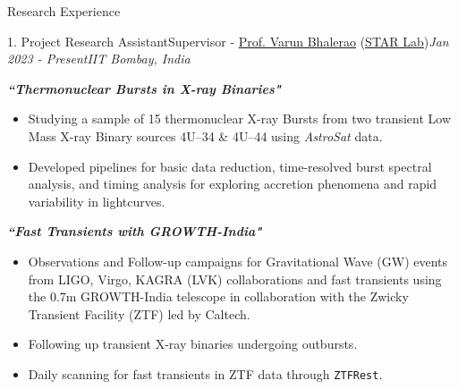 \vspace{-0.7em}
\begin{section}{Research Experience}

    \begin{subsectionnobullet1}{1. Project Research Assistant}{Supervisor - \href{https://www.phy.iitb.ac.in/en/content/varun-bhalerao}{Prof. Varun Bhalerao} (\href{https://www.star-iitb.in/}{STAR Lab})}{\textit{Jan 2023 - Present}}{\textit{IIT Bombay, India}}{}

        \vspace{-0.5em}

        \textbf{\textit{``Thermonuclear Bursts in X-ray Binaries"}}
        \vspace{-0.5em}
        \begin{itemize}
            \item Studying a sample of 15 thermonuclear X-ray Bursts from two transient Low Mass X-ray Binary sources 4U--34 \& 4U--44 using \textit{AstroSat} data.
            \vspace{-0.5em}
            \item Developed pipelines for basic data reduction, time-resolved burst spectral analysis, and timing analysis for exploring accretion phenomena and rapid variability in lightcurves.
        \end{itemize}
        \vspace{-0.5em}
        \textbf{\textit{``Fast Transients with GROWTH-India"}}
        \vspace{-0.5em}
        \begin{itemize}
            \item Observations and Follow-up campaigns for Gravitational Wave (GW) events from LIGO, Virgo, KAGRA (LVK) collaborations and fast transients using the 0.7m GROWTH-India telescope in collaboration with the Zwicky Transient Facility (ZTF) led by Caltech. 
            \vspace{-0.5em}
            \item Following up transient X-ray binaries undergoing outbursts.
            \vspace{-0.5em}
            \item Daily scanning for fast transients in ZTF data through \texttt{ZTFRest}.
        \end{itemize}
        
    \end{subsectionnobullet1}


\end{section}
